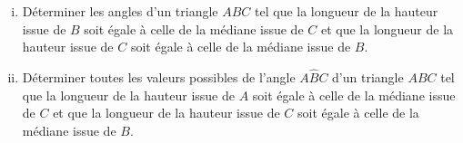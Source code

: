 \documentclass[varwidth]{standalone}
\begin{document}
    \begin{enumerate}[i)]
        \item D\'eterminer les angles d'un triangle $ABC$ tel que la longueur de la hauteur issue de $B$ soit \'egale \`a celle de la m\'ediane issue de $C$ et que la longueur de la hauteur issue de $C$ soit \'egale \`a celle de la m\'ediane issue de $B$.
        \item D\'eterminer toutes les valeurs possibles de l'angle $A\hat{B}C$ d'un triangle $ABC$ tel que la longueur de la hauteur issue de $A$ soit \'egale \`a celle de la m\'ediane issue de $C$ et que la longueur de la hauteur issue de $C$ soit \'egale \`a celle de la m\'ediane issue de $B$.
    \end{enumerate}
\end{document}
